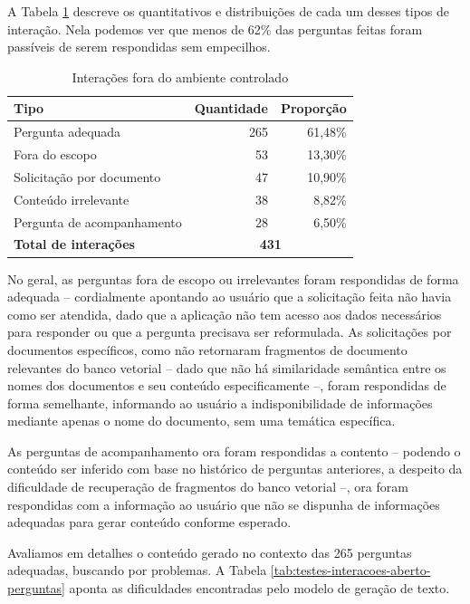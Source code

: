 A Tabela \ref{tab:testes-interacoes-aberto} descreve os quantitativos e distribuições de cada um desses tipos de interação. Nela podemos ver que menos de 62\% das perguntas feitas foram passíveis de serem respondidas sem empecilhos.

\begin{table}[H]
    \centering
    \begin{tabular}{l r r}
        \hline
        \textbf{Tipo} &\textbf{Quantidade} & \textbf{Proporção} \\
        \hline
        Pergunta adequada & 265 & 61,48\% \\
        Fora do escopo & 53 & 13,30\% \\
        Solicitação por documento & 47 & 10,90\% \\
        Conteúdo irrelevante & 38 & 8,82\% \\
        Pergunta de acompanhamento & 28 & 6,50\% \\
        \hline
        \textbf{Total de interações} & \multicolumn{2}{c}{\textbf{431}} \\
        \hline
    \end{tabular}
    \caption{Interações fora do ambiente controlado}
    \label{tab:testes-interacoes-aberto}
\end{table}

No geral, as perguntas fora de escopo ou irrelevantes foram respondidas de forma adequada -- cordialmente apontando ao usuário que a solicitação feita não havia como ser atendida, dado que a aplicação não tem acesso aos dados necessários para responder ou que a pergunta precisava ser reformulada. As solicitações por documentos específicos, como não retornaram fragmentos de documento relevantes do banco vetorial -- dado que não há similaridade semântica entre os nomes dos documentos e seu conteúdo especificamente --, foram respondidas de forma semelhante, informando ao usuário a indisponibilidade de informações mediante apenas o nome do documento, sem uma temática específica.

As perguntas de acompanhamento ora foram respondidas a contento -- podendo o conteúdo ser inferido com base no histórico de perguntas anteriores, a despeito da dificuldade de recuperação de fragmentos do banco vetorial --, ora foram respondidas com a informação ao usuário que não se dispunha de informações adequadas para gerar conteúdo conforme esperado.

Avaliamos em detalhes o conteúdo gerado no contexto das 265 perguntas adequadas, buscando por problemas. A Tabela \ref{tab:testes-interacoes-aberto-perguntas} aponta as dificuldades encontradas pelo modelo de geração de texto.

